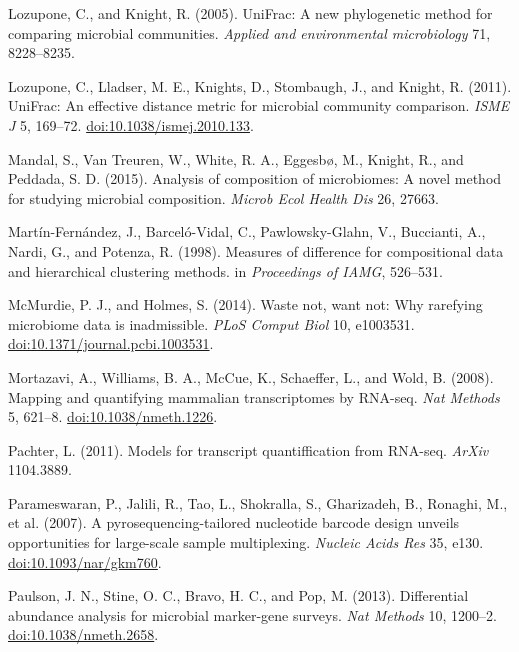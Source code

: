 \documentclass[twocolumn]{article}
\begin{document}
Lozupone, C., and Knight, R. (2005). UniFrac: A new phylogenetic method
for comparing microbial communities. \emph{Applied and environmental
microbiology} 71, 8228--8235.

Lozupone, C., Lladser, M. E., Knights, D., Stombaugh, J., and Knight, R.
(2011). UniFrac: An effective distance metric for microbial community
comparison. \emph{ISME J} 5, 169--72.
\href{http://doi.org/10.1038/ismej.2010.133}{doi:10.1038/ismej.2010.133}.

Mandal, S., Van Treuren, W., White, R. A., Eggesbø, M., Knight, R., and
Peddada, S. D. (2015). Analysis of composition of microbiomes: A novel
method for studying microbial composition. \emph{Microb Ecol Health Dis}
26, 27663.

Martín-Fernández, J., Barceló-Vidal, C., Pawlowsky-Glahn, V., Buccianti,
A., Nardi, G., and Potenza, R. (1998). Measures of difference for
compositional data and hierarchical clustering methods. in
\emph{Proceedings of IAMG}, 526--531.

McMurdie, P. J., and Holmes, S. (2014). Waste not, want not: Why
rarefying microbiome data is inadmissible. \emph{PLoS Comput Biol} 10,
e1003531.
\href{http://doi.org/10.1371/journal.pcbi.1003531}{doi:10.1371/journal.pcbi.1003531}.

Mortazavi, A., Williams, B. A., McCue, K., Schaeffer, L., and Wold, B.
(2008). Mapping and quantifying mammalian transcriptomes by RNA-seq.
\emph{Nat Methods} 5, 621--8.
\href{http://doi.org/10.1038/nmeth.1226}{doi:10.1038/nmeth.1226}.

Pachter, L. (2011). Models for transcript quantiffication from RNA-seq.
\emph{ArXiv} 1104.3889.

Parameswaran, P., Jalili, R., Tao, L., Shokralla, S., Gharizadeh, B.,
Ronaghi, M., et al. (2007). A pyrosequencing-tailored nucleotide barcode
design unveils opportunities for large-scale sample multiplexing.
\emph{Nucleic Acids Res} 35, e130.
\href{http://doi.org/10.1093/nar/gkm760}{doi:10.1093/nar/gkm760}.

Paulson, J. N., Stine, O. C., Bravo, H. C., and Pop, M. (2013).
Differential abundance analysis for microbial marker-gene surveys.
\emph{Nat Methods} 10, 1200--2.
\href{http://doi.org/10.1038/nmeth.2658}{doi:10.1038/nmeth.2658}.
\end{document}
